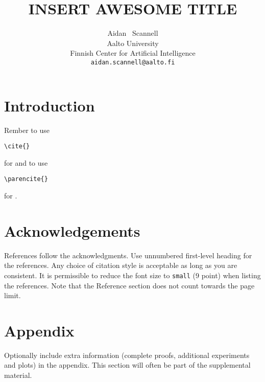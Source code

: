 \documentclass{article}
\title{INSERT AWESOME TITLE}
\author{%
  Aidan ~Scannell \\
  Aalto University\\
  Finnish Center for Artificial Intelligence \\
  \texttt{aidan.scannell@aalto.fi} \\
}
\begin{document}
\maketitle

\section{Introduction} \label{sec:intro}

Rember to use
\begin{verbatim}
\cite{}
\end{verbatim}
for \cite{kamtheDataEfficient2018} and to use
\begin{verbatim}
\parencite{}
\end{verbatim}
for \parencite{kamtheDataEfficient2018}.

\section*{Acknowledgements}

\small
\printbibliography
\normalsize

References follow the acknowledgments. Use unnumbered first-level heading for
the references. Any choice of citation style is acceptable as long as you are
consistent. It is permissible to reduce the font size to \verb+small+ (9 point)
when listing the references.
Note that the Reference section does not count towards the page limit.
\medskip



\appendix

\section{Appendix}

Optionally include extra information (complete proofs, additional experiments and plots) in the appendix.
This section will often be part of the supplemental material.
\end{document}
